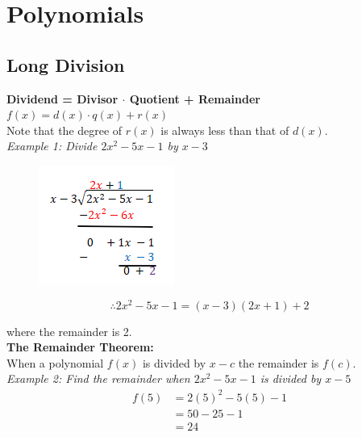 \section{Polynomials}

    \subsection{Long Division}
        \color{purple} \textbf{Dividend = Divisor $\cdot$ Quotient + Remainder} \color{black} \\
        \noindent $f(x)=d(x)\cdot q(x)+r(x)$ \\
        \noindent Note that the degree of $r(x)$ is always less than that of $d(x)$. \\

        \noindent \color{blue} \textit{Example 1: Divide $2x^2-5x-1$ by $x-3$} \color{black} \\

        \begin{figure} [hbt!]
            \centering
            \includegraphics[scale = 0.8] {Resources/Unit3Polynomials/longdiv.PNG}
        \end{figure}

        \begin{equation*}
            \therefore 2x^2-5x-1 = (x-3)(2x+1)+2
        \end{equation*}

        \noindent where the remainder is 2. \\

        \noindent \color{purple} \textbf{The Remainder Theorem:} \color{black} \\
        \noindent When a polynomial $f(x)$ is divided by $x-c$ the remainder is $f(c)$. \\

        \noindent \color{blue} \textit{Example 2: Find the remainder when $2x^2-5x-1$ is
        divided by $x-5$} \color{black} \\

        \begin{align*}
            f(5) &= 2(5)^2-5(5)-1 \\
            &= 50-25-1 \\
            &= 24
        \end{align*}

